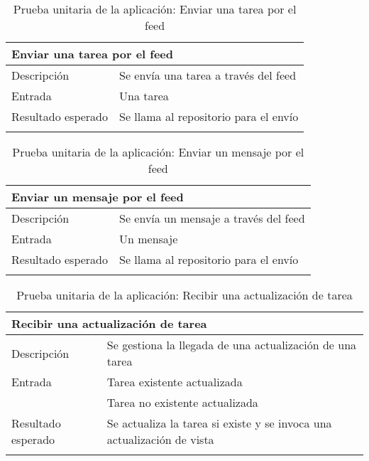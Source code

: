 \begin{longtable}{|p{} p{}|}
    \hline
    \multicolumn{2}{|l|}{\textbf{Enviar una tarea por el feed}} \\ \hline 
    Descripción                 & Se envía una tarea a través del feed \\ \hline
    Entrada                     & Una tarea \\\hline
    Resultado esperado          & Se llama al repositorio para el envío \\ \hline
    \caption{Prueba unitaria de la aplicación: Enviar una tarea por el feed}
    \label{cp:u:app:enviar_tarea_feed}
\end{longtable}

\begin{longtable}{|p{} p{}|}
    \hline
    \multicolumn{2}{|l|}{\textbf{Enviar un mensaje por el feed}} \\ \hline 
    Descripción                 & Se envía un mensaje a través del feed \\ \hline
    Entrada                     & Un mensaje \\\hline
    Resultado esperado          & Se llama al repositorio para el envío \\ \hline
    \caption{Prueba unitaria de la aplicación: Enviar un mensaje por el feed}
    \label{cp:u:app:enviar_mensaje_feed}
\end{longtable}

\newpage
\begin{longtable}{|p{} p{}|}
    \hline
    \multicolumn{2}{|l|}{\textbf{Recibir una actualización de tarea}} \\ \hline 
    Descripción                 & Se gestiona la llegada de una actualización de una tarea \\ \hline
    Entrada                     & Tarea existente actualizada \\
                                & Tarea no existente actualizada \\ \hline
    Resultado esperado          & Se actualiza la tarea si existe y se invoca una actualización de vista \\ \hline
    \caption{Prueba unitaria de la aplicación: Recibir una actualización de tarea}
    \label{cp:u:app:recibir_actualizacion_tarea}
\end{longtable}


